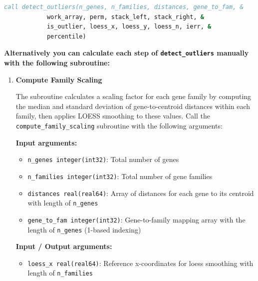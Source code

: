 \begin{enumerate}
          \begin{lstlisting}[language=Fortran, caption={Gene Outlier Calculation}]
call detect_outliers(n_genes, n_families, distances, gene_to_fam, &
            work_array, perm, stack_left, stack_right, &
            is_outlier, loess_x, loess_y, loess_n, ierr, &
            percentile)
          \end{lstlisting}
          
          \textbf{Alternatively you can calculate each step of \texttt{detect\_outliers}
          manually with the following subroutine:}
          \begin{enumerate}
            \item \textbf{Compute Family Scaling}
                  
                  The subroutine calculates a scaling factor for each gene family by
                  computing the median and standard deviation of gene-to-centroid distances
                  within each family, then applies LOESS smoothing to these values. Call
                  the \texttt{compute\_family\_scaling} subroutine with the
                  following arguments:
                  
                  \textbf{Input arguments:}
                  \begin{itemize}
                    \item \texttt{n\_genes integer(int32)}: Total number of genes
                          
                    \item \texttt{n\_families integer(int32)}: Total number of gene families
                          
                    \item \texttt{distances real(real64)}: Array of distances for each
                          gene to its centroid with length of \texttt{n\_genes}
                          
                    \item \texttt{gene\_to\_fam integer(int32)}: Gene-to-family mapping
                          array with the length of \texttt{n\_genes} (1-based indexing)
                  \end{itemize}
                  
                  \textbf{Input / Output arguments:}
                  \begin{itemize}
                    \item \texttt{loess\_x real(real64)}: Reference x-coordinates for
                          loess smoothing with length of \texttt{n\_families}
                          

\end{itemize}
\end{enumerate}
\end{enumerate}
